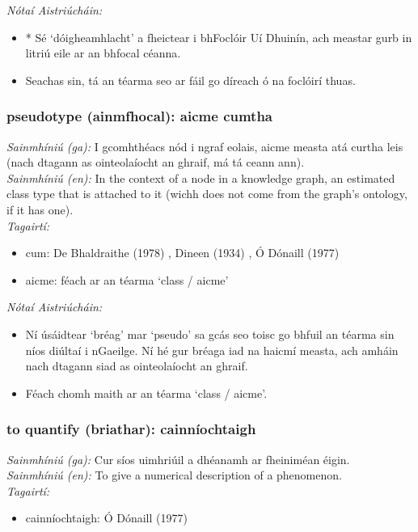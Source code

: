  \noindent \textit{Nótaí Aistriúcháin:}
\begin{itemize}
	\item * Sé `dóigheamhlacht' a fheictear i bhFoclóir Uí Dhuinín, ach meastar gurb in litriú eile ar an bhfocal céanna.
	\item Seachas sin, tá an téarma seo ar fáil go díreach ó na foclóirí thuas.
\end{itemize}


\subsubsection*{pseudotype (ainmfhocal): aicme cumtha}
 \noindent \textit{Sainmhíniú (ga):} I gcomhthéacs nód i ngraf eolais, aicme measta atá curtha leis (nach dtagann as ointeolaíocht an ghraif, má tá ceann ann).
\\
 \noindent \textit{Sainmhíniú (en):} In the context of a node in a knowledge graph, an estimated class type that is attached to it (wichh does not come from the graph's ontology, if it has one).
\\
 \noindent \textit{Tagairtí:}
\begin{itemize}
	\item cum: De Bhaldraithe (1978) \cite{de-bhaldraithe}, Dineen (1934) \cite{dineen}, Ó Dónaill (1977) \cite{odonaill}
	\item aicme: féach ar an téarma `class / aicme'
\end{itemize}

 \noindent \textit{Nótaí Aistriúcháin:}
\begin{itemize}
	\item Ní úsáidtear `bréag' mar `pseudo' sa gcás seo toisc go bhfuil an téarma sin níos diúltaí i nGaeilge. Ní hé gur bréaga iad na haicmí measta, ach amháin nach dtagann siad as ointeolaíocht an ghraif.
	\item Féach chomh maith ar an téarma `class / aicme'.
\end{itemize}


\subsubsection*{to quantify (briathar): cainníochtaigh}
 \noindent \textit{Sainmhíniú (ga):} Cur síos uimhriúil a dhéanamh ar fheiniméan éigin.
\\
 \noindent \textit{Sainmhíniú (en):} To give a numerical description of a phenomenon.
\\
 \noindent \textit{Tagairtí:}
\begin{itemize}
	\item cainníochtaigh: Ó Dónaill (1977) \cite{odonaill}
\end{itemize}

